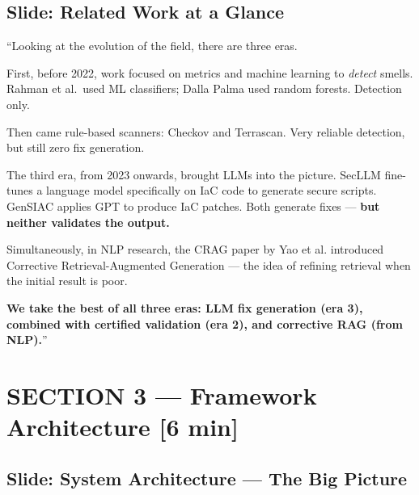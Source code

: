 \documentclass[12pt,a4paper]{article}
\newcommand{\timing}[1]{{\color{slidegold}\textbf{[#1]}}}
\begin{document}
\subsection{Slide: Related Work at a Glance}

\begin{saybox}
``Looking at the evolution of the field, there are three eras.

First, before 2022, work focused on metrics and machine learning to \textit{detect} smells.
Rahman et al.\ used ML classifiers; Dalla Palma used random forests. Detection only.

Then came rule-based scanners: Checkov and Terrascan. Very reliable detection,
but still zero fix generation.

The third era, from 2023 onwards, brought LLMs into the picture.
SecLLM fine-tunes a language model specifically on IaC code to generate secure scripts.
GenSIAC applies GPT to produce IaC patches. Both generate fixes ---
\textbf{but neither validates the output.}

Simultaneously, in NLP research, the CRAG paper by Yao et al. introduced
Corrective Retrieval-Augmented Generation --- the idea of refining retrieval
when the initial result is poor.

\textbf{We take the best of all three eras: LLM fix generation (era 3),
combined with certified validation (era 2), and corrective RAG (from NLP).}''
\end{saybox}

\section{SECTION 3 --- Framework Architecture \timing{6 min}}

\subsection{Slide: System Architecture --- The Big Picture}
\end{document}
